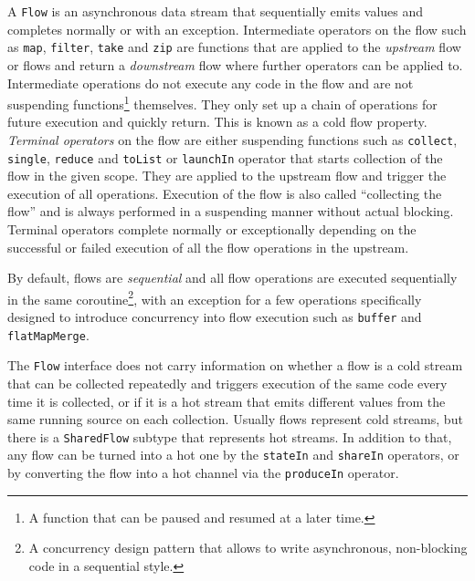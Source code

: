 A \texttt{Flow} is an asynchronous data stream that sequentially emits values and completes normally or with an exception. Intermediate operators on the flow such as \texttt{map}, \texttt{filter}, \texttt{take} and \texttt{zip} are functions that are applied to the \textit{upstream} flow or flows and return a \textit{downstream} flow where further operators can be applied to. Intermediate operations do not execute any code in the flow and are not suspending functions\footnote{A function that can be paused and resumed at a later time.} themselves. They only set up a chain of operations for future execution and quickly return. This is known as a cold flow property. \textit{Terminal operators} on the flow are either suspending functions such as \texttt{collect}, \texttt{single}, \texttt{reduce} and \texttt{toList} or \texttt{launchIn} operator that starts collection of the flow in the given scope. They are applied to the upstream flow and trigger the execution of all operations. Execution of the flow is also called ``collecting the flow'' and is always performed in a suspending manner without actual blocking. Terminal operators complete normally or exceptionally depending on the successful or failed execution of all the flow operations in the upstream.

By default, flows are \textit{sequential} and all flow operations are executed sequentially in the same coroutine\footnote{A concurrency design pattern that allows to write asynchronous, non-blocking code in a sequential style.}, with an exception for a few operations specifically designed to introduce concurrency into flow execution such as \texttt{buffer} and \texttt{flatMapMerge}.

The \texttt{Flow} interface does not carry information on whether a flow is a cold stream that can be collected repeatedly and triggers execution of the same code every time it is collected, or if it is a hot stream that emits different values from the same running source on each collection. Usually flows represent cold streams, but there is a \texttt{SharedFlow} subtype that represents hot streams. In addition to that, any flow can be turned into a hot one by the \texttt{stateIn} and \texttt{shareIn} operators, or by converting the flow into a hot channel via the \texttt{produceIn} operator.

\begin{figure}[ht!]
    \centering
    \begin{subfigure}[b]{\textwidth}
        \centering
        
    \end{subfigure}
    \hfill
    \begin{subfigure}[b]{\textwidth}
        \centering
        
    \end{subfigure}
\end{figure}

